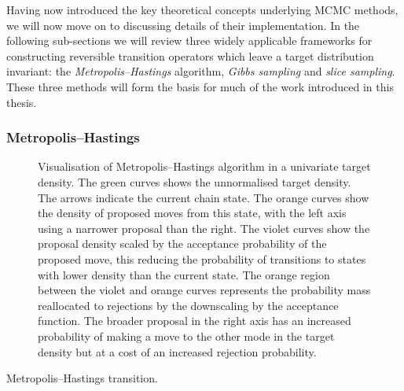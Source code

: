 Having now introduced the key theoretical concepts underlying \ac{MCMC} methods, we will now move on to discussing details of their implementation. In the following sub-sections we will review three widely applicable frameworks for constructing reversible transition operators which leave a target distribution invariant: the \emph{Metropolis--Hastings} algorithm, \emph{Gibbs sampling} and \emph{slice sampling}. These three methods will form the basis for much of the work introduced in this thesis.

\subsubsection{Metropolis--Hastings}

\begin{figure}[t]
\centering
{}
\caption[Visualisation of Metropolis--Hastings algorithm.]{Visualisation of Metropolis--Hastings algorithm in a univariate target density. The green curves shows the unnormalised target density. The arrows indicate the current chain state. The orange curves show the density of proposed moves from this state, with the left axis using a narrower proposal than the right. The violet curves show the proposal density scaled by the acceptance probability of the proposed move, this reducing the probability of transitions to states with lower density than the current state. The orange region between the violet and orange curves represents the probability mass reallocated to rejections by the downscaling by the acceptance function. The broader proposal in the right axis has an increased probability of making a move to the other mode in the target density but at a cost of an increased rejection probability.}
\label{fig:metropolis-hastings}
\end{figure}

\begin{algorithm}[!t]
\caption{Metropolis--Hastings transition.}
\label{alg:metropolis-hastings}

\end{algorithm}


